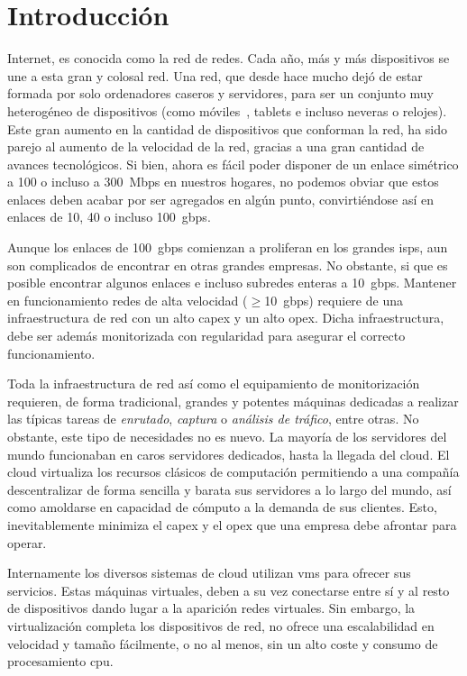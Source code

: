 \chapter{Introducción}

Internet, es conocida como la red de redes. Cada año, más y más dispositivos se une a esta gran y colosal red. Una red, que desde hace mucho dejó de estar formada por solo ordenadores caseros y servidores, para ser un conjunto muy heterogéneo de dispositivos (como móviles~\cite{bib:introduccion:smartphone}, tablets e incluso neveras o relojes). Este gran aumento en la cantidad de dispositivos que conforman la red, ha sido parejo al aumento de la velocidad de la red, gracias a una gran cantidad de avances tecnológicos. Si bien, ahora es fácil poder disponer de un enlace simétrico a 100 o incluso a 300~Mbps en nuestros hogares, no podemos obviar que estos enlaces deben acabar por ser agregados en algún punto, convirtiéndose así en enlaces de 10, 40 o incluso 100~\gls{gbps}.

Aunque los enlaces de 100~\gls{gbps} comienzan a proliferan en los grandes \glspl{isp}, aun son complicados de encontrar en otras grandes empresas. No obstante, si que es posible encontrar algunos enlaces e incluso subredes enteras a 10~\gls{gbps}. Mantener en funcionamiento redes de alta velocidad ($\geq$10~\gls{gbps}) requiere de una infraestructura de red con un alto \gls{capex} y un alto \gls{opex}. Dicha infraestructura, debe ser además monitorizada con regularidad para asegurar el correcto funcionamiento.

Toda la infraestructura de red así como el equipamiento de monitorización requieren, de forma tradicional, grandes y potentes máquinas dedicadas a realizar las típicas tareas de \textit{enrutado}, \textit{captura} o \textit{análisis de tráfico}, entre otras. No obstante, este tipo de necesidades no es nuevo. La mayoría de los servidores del mundo funcionaban en caros servidores dedicados, hasta la llegada del \gls{cloud}. El \gls{cloud} virtualiza los recursos clásicos de computación permitiendo a una compañía descentralizar de forma sencilla y barata sus servidores a lo largo del mundo, así como amoldarse en capacidad de cómputo a la demanda de sus clientes. Esto, inevitablemente minimiza el \gls{capex} y el \gls{opex} que una empresa debe afrontar para operar.

Internamente los diversos sistemas de \gls{cloud} utilizan \glspl{vm} para ofrecer sus servicios. Estas máquinas virtuales, deben a su vez conectarse entre sí y al resto de dispositivos dando lugar a la aparición redes virtuales. Sin embargo, la virtualización completa los dispositivos de red, no ofrece una escalabilidad en velocidad y tamaño fácilmente, o no al menos, sin un alto coste y consumo de procesamiento \gls{cpu}.

